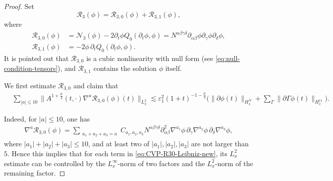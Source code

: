 \documentclass[11pt,twoside]{article}
\def\p{\partial}
\def\ve{\varepsilon}
\def\ls{\lesssim}
\theoremstyle{plain}
\theoremstyle{definition}
\theoremstyle{assumption}
\numberwithin{equation}{section}
\begin{document}
\begin{proof}
		
		
		
		Set
		\begin{equation}
			\label{eq:CVP-R3-splitting-new}
			\mathcal R_3(\phi)
			=\mathcal R_{3,0}(\phi)
			+\mathcal R_{3,1}(\phi),
		\end{equation}
		where
		\begin{equation}
			\label{eq:CVP-R30-R31-definition-new}
			\begin{aligned}
				\mathcal R_{3,0}(\phi)
				&=
				\mathcal N_3(\phi)
				-
				2\p_t\phi Q_0(\p_t\phi,\phi)
				=
				N^{\alpha\beta\gamma\delta}\p_{\alpha\beta}\phi \p_\gamma\phi \p_\delta\phi,
				\\
				\mathcal R_{3,1}(\phi)
				&=
				-2\phi\,\p_tQ_0(\p_t\phi,\phi).
			\end{aligned}
		\end{equation}
		It is pointed out that \(\mathcal R_{3,0}\) is a cubic nonlinearity with null form (see \eqref{eq:null-condition-tensors}),
and \(\mathcal R_{3,1}\) contains the solution \(\phi\) itself.
		
		We first estimate \(\mathcal R_{3,0}\) and claim that
		\begin{equation}
			\label{eq:CVP-R30-time-estimate-new}
			\begin{aligned}
				&
				\sum_{|a|\le 10}
				\big\|
				A^{1+\frac{\mu}{4}}(t,\cdot)
				\nabla^a\mathcal R_{3,0}(\phi)(t)
				\big\|_{L^2_x}
			\ls
				\ve_1^2
				(1+t)^{-1-\frac{\mu}{4}}
				\big(
				\|\p\phi(t)\|_{H^N_x}
				+
				\sum_{\Gamma}
				\|\p\Gamma\phi(t)\|_{H^{11}_x}
				\big).
			\end{aligned}
		\end{equation}
		
		Indeed, for \(|a|\le 10\), one has
		\begin{equation}\label{eq:CVP-R30-Leibniz-new}
			\begin{aligned}
				\nabla^a\mathcal R_{3,0}(\phi)
				=\sum_{\substack{a_1+a_2+a_3=a}}
				C_{a_1,a_2,a_3}
				N^{\alpha\beta\gamma\delta}
				\p_{\alpha\beta}^2\nabla^{a_1}\phi\,
				\p_\gamma\nabla^{a_2}\phi\,
				\p_\delta\nabla^{a_3}\phi,
			\end{aligned}
		\end{equation}
		where \(|a_1|+|a_2|+|a_3|\le 10\), and at least two of
		\(|a_1|,|a_2|,|a_3|\) are not larger than $5$. Hence this implies
that for each term in \eqref{eq:CVP-R30-Leibniz-new}, its \(L^2_x\) estimate can be controlled by the \(L^\infty_x\)-norm
of 	two factors and the \(L^2_x\)-norm of the remaining factor.
		

\end{proof}
\end{document}
